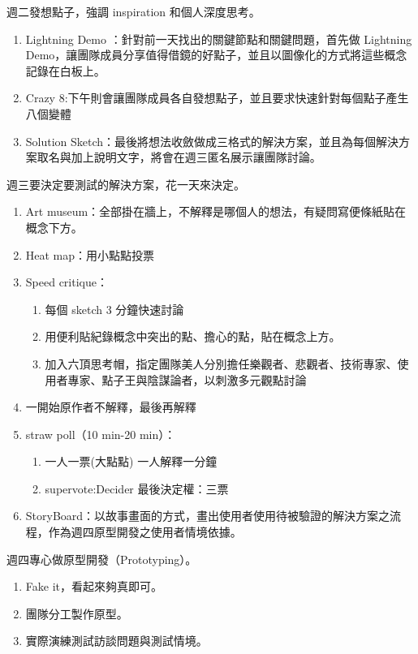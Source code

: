 \documentclass[12pt,a4paper]{article}
\begin{document}
\begin{enumerate}
週二發想點子，強調 inspiration 和個人深度思考。
\begin{enumerate}
\item Lightning Demo ：針對前一天找出的關鍵節點和關鍵問題，首先做 Lightning Demo，讓團隊成員分享值得借鏡的好點子，並且以圖像化的方式將這些概念記錄在白板上。
\item Crazy 8:下午則會讓團隊成員各自發想點子，並且要求快速針對每個點子產生八個變體
\item Solution Sketch：最後將想法收斂做成三格式的解決方案，並且為每個解決方案取名與加上說明文字，將會在週三匿名展示讓團隊討論。
\end{enumerate}

週三要決定要測試的解決方案，花一天來決定。
\begin{enumerate}
\item Art museum：全部掛在牆上，不解釋是哪個人的想法，有疑問寫便條紙貼在概念下方。
\item Heat map：用小點點投票
\item Speed critique：
\begin{enumerate}
\item 每個 sketch 3 分鐘快速討論
\item 用便利貼紀錄概念中突出的點、擔心的點，貼在概念上方。
\item 加入六頂思考帽，指定團隊美人分別擔任樂觀者、悲觀者、技術專家、使用者專家、點子王與陰謀論者，以刺激多元觀點討論
\end{enumerate}
\item 一開始原作者不解釋，最後再解釋
\item straw poll（10 min-20 min）：
\begin{enumerate}
\item 一人一票(大點點) 一人解釋一分鐘
\item supervote:Decider 最後決定權：三票
\end{enumerate}
\item StoryBoard：以故事畫面的方式，畫出使用者使用待被驗證的解決方案之流程，作為週四原型開發之使用者情境依據。
\end{enumerate}

週四專心做原型開發（Prototyping）。
\begin{enumerate}
\item Fake it，看起來夠真即可。
\item 團隊分工製作原型。
\item 實際演練測試訪談問題與測試情境。
\end{enumerate}


\end{enumerate}
\end{document}
